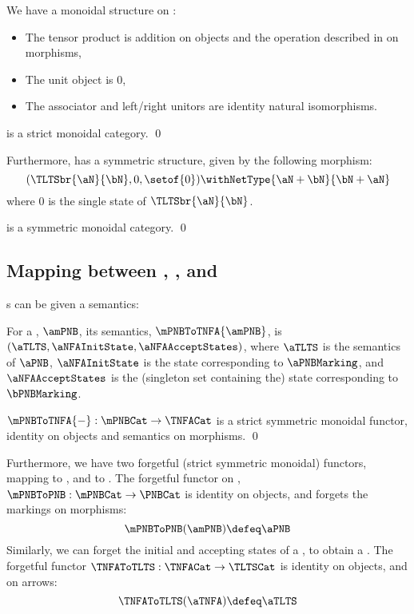 We have a monoidal structure on \TNFACat{}:

\begin{itemize}
    \item The tensor product is addition on objects and the operation described
        in  on morphisms,
    \item The unit object is $0$,
    \item The associator and left/right unitors are identity natural
        isomorphisms.
\end{itemize}

\begin{proposition}
    \TNFACat{} is a strict monoidal category. \qed
\end{proposition}

Furthermore, \TNFACat{} has a symmetric structure, given by the following
morphism:
\[
    (\TLTSbr{\aN}{\bN}, 0, \setof{0}) \withNetType{\aN + \bN}{\bN + \aN}
\] where $0$ is the single state of $\TLTSbr{\aN}{\bN}$.

\begin{proposition}
    \TNFACat{} is a symmetric monoidal category. \qed
\end{proposition}

\subsection{Mapping between \mPNBCat{}, \TNFACat{}, \PNBCat{} and
\TLTSCat{}}\label{sec:functorPNBTLTS}

\mPNB{}s can be given a \TNFA{} semantics:

\begin{definition}
    For a \mPNB{}, $\amPNB$, its \TNFA{} semantics, $\mPNBToTNFA{\amPNB}$, is
    $(\aTLTS, \aNFAInitState, \aNFAAcceptStates)$, where $\aTLTS$ is the
    \TLTS{} semantics of $\aPNB$, $\aNFAInitState$ is the state
    corresponding to $\aPNBMarking$, and $\aNFAAcceptStates$ is the (singleton
    set containing the) state corresponding to $\bPNBMarking$.
\end{definition}

\begin{proposition}
    $\mPNBToTNFA{-} : \mPNBCat \to \TNFACat$ is a strict symmetric monoidal
    functor, identity on objects and \TNFA{} semantics on morphisms. \qed
\end{proposition}

Furthermore, we have two forgetful (strict symmetric monoidal) functors,
mapping \mPNBCat{} to \PNBCat{}, and \TNFACat{} to \TLTSCat{}. The forgetful
functor on \mPNBCat, $\mPNBToPNB : \mPNBCat \to \PNBCat$ is identity on
objects, and forgets the markings on morphisms:
\[
    \mPNBToPNB(\amPNB) \defeq \aPNB
\]
Similarly, we can forget the initial and accepting states of a \TNFA, to obtain
a \TLTS. The forgetful functor $\TNFAToTLTS : \TNFACat \to \TLTSCat$ is
identity on objects, and on arrows:
\[
    \TNFAToTLTS(\aTNFA) \defeq \aTLTS
\]

